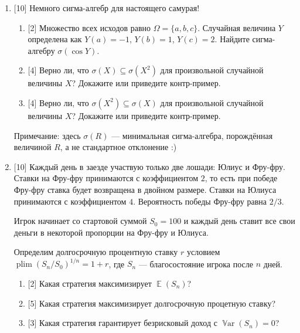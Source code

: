 \documentclass[12pt]{article}
\DeclareMathOperator{\Var}{\mathbb{V}ar}
\DeclareMathOperator{\E}{\mathbb{E}}
\DeclareMathOperator{\plim}{plim}
\begin{document}
\begin{enumerate}
\item {[10]} Немного сигма-алгебр для настоящего самурая!
\begin{enumerate}
    \item {[2]} Множество всех исходов равно $\Omega = \{a, b, c\}$. 
    Случайная величина $Y$ определена как $Y(a) = -1$, $Y(b) = 1$, $Y(c) = 2$.
    Найдите сигма-алгебру $\sigma(\cos Y)$.
    \item {[4]} Верно ли, что $\sigma(X) \subseteq \sigma(X^2)$ для произвольной случайной величины $X$? Докажите или приведите контр-пример.
    \item {[4]} Верно ли, что $\sigma(X^2) \subseteq \sigma(X)$ для произвольной случайной величины $X$? Докажите или приведите контр-пример.
\end{enumerate}

Примечание: здесь $\sigma(R)$ — минимальная сигма-алгебра, порождённая величиной $R$, а не стандартное отклонение :)

\item {[10]} Каждый день в заезде участвую только две лошади: Юлиус и Фру-фру. 
Ставки на Фру-фру принимаются с коэффициентом $2$, то есть при победе Фру-фру ставка будет возвращена в двойном размере. 
Ставки на Юлиуса принимаются с коэффициентом $4$.
Вероятность победы Фру-фру равна $2/3$.

Игрок начинает со стартовой суммой $S_0 = 100$ и каждый день ставит все свои деньги в некоторой пропорции на Фру-фру и Юлиуса. 

Определим долгосрочную процентную ставку $r$ условием $\plim (S_n / S_0)^{1/n} = 1 + r$, где $S_n$ — благосостояние игрока после $n$ дней.
\begin{enumerate}
    \item {[2]} Какая стратегия максимизирует $\E(S_n)$?
    \item {[5]} Какая стратегия максимизирует долгосрочную процетную ставку?
    \item {[3]} Какая стратегия гарантирует безрисковый доход с $\Var(S_n) = 0$?
\end{enumerate}

\end{enumerate}
    
\end{document}
